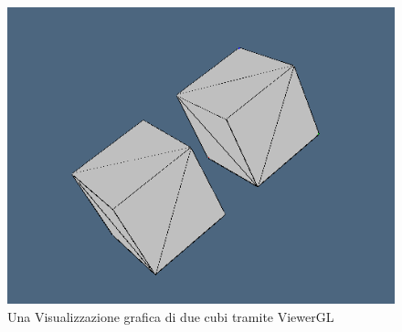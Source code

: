 \documentclass[a4paper]{extreport}
\begin{document}
\begin{figure}[!h]
    \includegraphics[width=\textwidth]{./immagini/mapperJL2.png}
    \caption{Una Visualizzazione grafica di due cubi tramite ViewerGL}
\end{figure}
\end{document}
